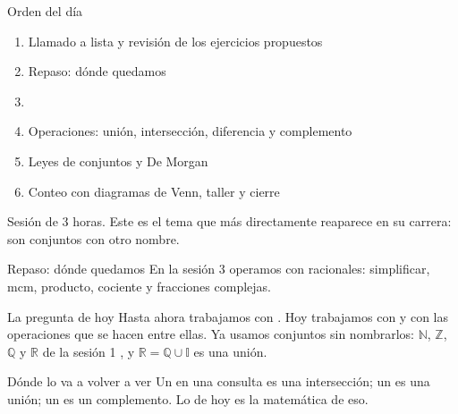 \documentclass[aspectratio=169,10pt]{beamer}
\begin{document}
\portada

\begin{frame}{Orden del día}
  \begin{enumerate}
    \item Llamado a lista y revisión de los ejercicios propuestos
    \item Repaso: dónde quedamos
    \item {}
    \item Operaciones: unión, intersección, diferencia y complemento
    \item Leyes de conjuntos y De Morgan
    \item Conteo con diagramas de Venn, taller y cierre
  \end{enumerate}

  \vspace{0.25cm}
  {\footnotesize\color{uniGris} Sesión de 3 horas. Este es el tema que más
  directamente reaparece en su carrera:  son conjuntos con otro
  nombre.}
\end{frame}

\begin{frame}{Repaso: dónde quedamos}
  \footnotesize
  En la sesión 3 operamos con racionales: simplificar, mcm, producto,
  cociente y fracciones complejas.

  \vspace{0.2cm}
  \begin{alertblock}{La pregunta de hoy}
    \footnotesize
    Hasta ahora trabajamos con . Hoy trabajamos con
     y con las operaciones que se hacen entre
    ellas. Ya usamos conjuntos sin nombrarlos: $\mathbb{N}$, $\mathbb{Z}$,
    $\mathbb{Q}$ y $\mathbb{R}$ de la sesión 1 , y
    $\mathbb{R} = \mathbb{Q}\cup\mathbb{I}$ es una unión.
  \end{alertblock}

  \vspace{0.2cm}
  \begin{block}{Dónde lo va a volver a ver}
    \footnotesize
    Un  en una consulta es una intersección; un
     es una unión; un  es un complemento.
    Lo de hoy es la matemática de eso.
  \end{block}
\end{frame}

\end{document}
